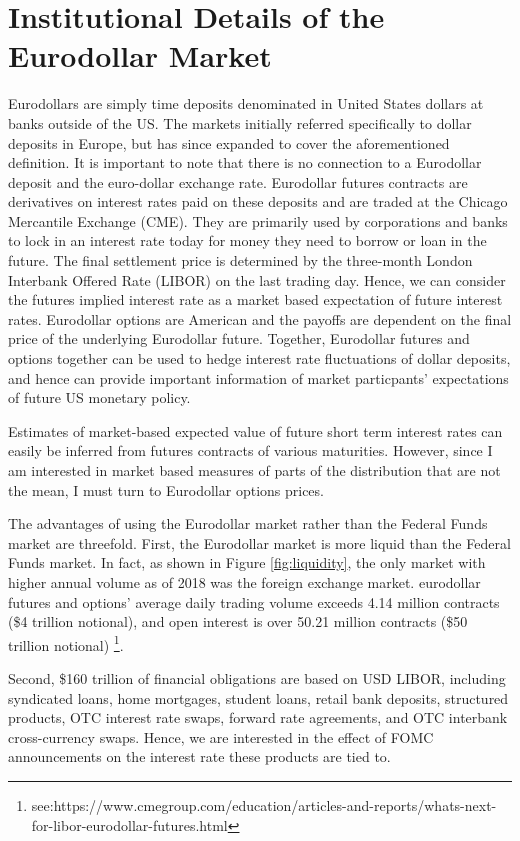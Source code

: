 \documentclass[11pt]{article}
\begin{document}
\section{Institutional Details of the Eurodollar Market}
Eurodollars are simply time deposits denominated in United States dollars at banks outside of the US. The markets initially referred specifically to dollar deposits in Europe, but has since expanded to cover the aforementioned definition. It is important to note that there is no connection to a Eurodollar deposit and the euro-dollar exchange rate. Eurodollar futures contracts are derivatives on interest rates paid on these deposits and are traded at the Chicago Mercantile Exchange (CME). They are primarily used by corporations and banks to lock in an interest rate today for money they need to borrow or loan in the future. The final settlement price is determined by the three-month London Interbank Offered Rate (LIBOR) on the last trading day. Hence, we can consider the futures implied interest rate as a market based expectation of future interest rates. Eurodollar options are American and the payoffs are dependent on the final price of the underlying Eurodollar future. Together, Eurodollar futures and options together can be used to hedge interest rate fluctuations of dollar deposits, and hence can provide important information of market particpants' expectations of future US monetary policy. 

Estimates of market-based expected value of future short term interest rates can easily be inferred from futures contracts of various maturities. However, since I am interested in market based measures of parts of the distribution that are not the mean, I must turn to Eurodollar options prices. 

The advantages of using the Eurodollar market rather than the Federal Funds market are threefold.  First, the Eurodollar market is more liquid than the Federal Funds market. In fact, as shown in Figure \ref{fig:liquidity}, the only market with higher annual volume as of 2018 was the foreign exchange market. eurodollar futures and options' average daily trading volume exceeds 4.14 million contracts (\$4 trillion notional), and open interest is over 50.21 million contracts (\$50 trillion notional) \footnote{see:https://www.cmegroup.com/education/articles-and-reports/whats-next-for-libor-eurodollar-futures.html }.

Second,  \$160 trillion of financial obligations are based on USD LIBOR, including syndicated loans, home mortgages, student loans, retail bank deposits, structured products, OTC interest rate swaps, forward rate agreements, and OTC interbank cross-currency swaps. Hence, we are interested in the effect of FOMC announcements on the interest rate these products are tied to. 
\end{document}
